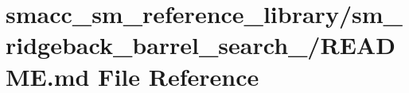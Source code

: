 \hypertarget{smacc__sm__reference__library_2sm__ridgeback__barrel__search__2_2README_8md}{}\section{smacc\+\_\+sm\+\_\+reference\+\_\+library/sm\+\_\+ridgeback\+\_\+barrel\+\_\+search\+\_/\+R\+E\+A\+D\+ME.md File Reference}
\label{smacc__sm__reference__library_2sm__ridgeback__barrel__search__2_2README_8md}
